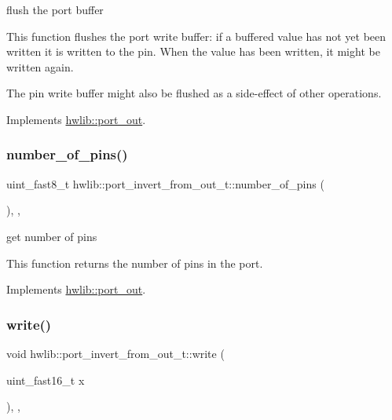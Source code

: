 flush the port buffer

This function flushes the port write buffer\+: if a buffered value has not yet been written it is written to the pin. When the value has been written, it might be written again.

The pin write buffer might also be flushed as a side-\/effect of other operations. 

Implements \hyperlink{classhwlib_1_1port__out_aff7c8d768ec0b7f3d738a47ef1a4bbfe}{hwlib\+::port\+\_\+out}.

\mbox{\label{classhwlib_1_1port__invert__from__out__t_af0b7be0e09f227190f2cee9c6f43120d}} 
\subsubsection{\texorpdfstring{number\+\_\+of\+\_\+pins()}{number\_of\_pins()}}
{\footnotesize\ttfamily uint\+\_\+fast8\+\_\+t hwlib\+::port\+\_\+invert\+\_\+from\+\_\+out\+\_\+t\+::number\+\_\+of\+\_\+pins (\begin{DoxyParamCaption}{ }\end{DoxyParamCaption})\hspace{0.3cm}{\ttfamily [inline]}, {\ttfamily [override]}, {\ttfamily [virtual]}}





get number of pins

This function returns the number of pins in the port. 

Implements \hyperlink{classhwlib_1_1port__out_a8593e2ff755b938797defb06c1e085df}{hwlib\+::port\+\_\+out}.

\mbox{\label{classhwlib_1_1port__invert__from__out__t_aaa8d6d9bb1d98cd3526d3eb6a91f34d9}} 
\subsubsection{\texorpdfstring{write()}{write()}}
{\footnotesize\ttfamily void hwlib\+::port\+\_\+invert\+\_\+from\+\_\+out\+\_\+t\+::write (\begin{DoxyParamCaption}\item[{uint\+\_\+fast16\+\_\+t}]{x }\end{DoxyParamCaption})\hspace{0.3cm}{\ttfamily [inline]}, {\ttfamily [override]}, {\ttfamily [virtual]}}







